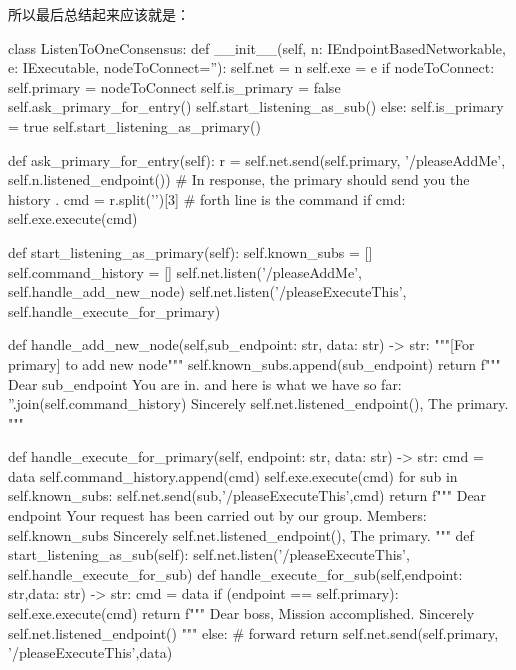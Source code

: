\documentclass[dvipsnames]{ctexart}
\begin{document}
所以最后总结起来应该就是：
\begin{simplepy}
class ListenToOneConsensus:
    def __init__(self,
                 n: IEndpointBasedNetworkable,
                 e: IExecutable,
                 nodeToConnect=''):
        self.net = n
        self.exe = e
        if nodeToConnect:
            self.primary = nodeToConnect
            self.is_primary = false
            self.ask_primary_for_entry()
            self.start_listening_as_sub()
        else:
            self.is_primary = true
            self.start_listening_as_primary()

    def ask_primary_for_entry(self):
        r = self.net.send(self.primary,
                    '/pleaseAddMe',
                    self.n.listened_endpoint())
        # In response, the primary should send you the history .
        cmd = r.split('\n')[3]  # forth line is the command
        if cmd:
            self.exe.execute(cmd)

    def start_listening_as_primary(self):
        self.known_subs = []
        self.command_history = []
        self.net.listen('/pleaseAddMe',
                        self.handle_add_new_node)
        self.net.listen('/pleaseExecuteThis',
                        self.handle_execute_for_primary)

    def handle_add_new_node(self,sub_endpoint: str,
                            data: str) -> str:
        """[For primary] to add new node"""
        self.known_subs.append(sub_endpoint)
        return f"""
        Dear {sub_endpoint}
            You are in. and here is what we have so far:
            {''.join(self.command_history)}
                   Sincerely
                   {self.net.listened_endpoint()}, The primary.
        """

    def handle_execute_for_primary(self, endpoint: str,
                                   data: str) -> str:
        cmd = data
        self.command_history.append(cmd)
        self.exe.execute(cmd)
        for sub in self.known_subs:
            self.net.send(sub,'/pleaseExecuteThis',cmd)
        return f"""
        Dear {endpoint}
             Your request has been carried out by our group.
             Members: {self.known_subs}
                 Sincerely
                 {self.net.listened_endpoint()}, The primary.
        """
    def start_listening_as_sub(self):
        self.net.listen('/pleaseExecuteThis',
                        self.handle_execute_for_sub)
    def handle_execute_for_sub(self,endpoint: str,data: str) -> str:
        cmd = data
        if (endpoint == self.primary):
            self.exe.execute(cmd)
            return f"""
            Dear boss,
                 Mission accomplished.
                     Sincerely
                     {self.net.listened_endpoint()}
            """
        else:
            # forward
            return self.net.send(self.primary,
                                 '/pleaseExecuteThis',data)
\end{simplepy}
\end{document}
